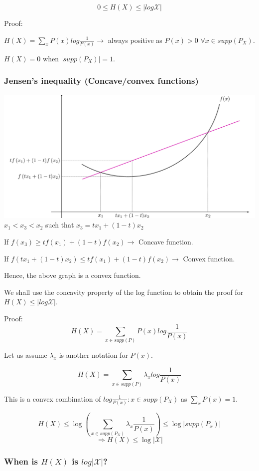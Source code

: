 \documentclass{article}
\begin{document}
$$ 0 \leq H(X) \leq |log \mathcal X|$$

Proof:

$ H(X)= \sum_x P(x)log \frac{1}{P(x)} \rightarrow $ always positive as $P(x)>0$ $\forall x \in supp(P_X)$.

$H(X)= 0$ when $|supp(P_X)|=1$.

\subsubsection{Jensen's inequality (Concave/convex functions)}

\includegraphics[width=\textwidth]{graph.png}
$x_1 < x_3 <x_2 $ such that $x_3= tx_1+(1-t)x_2$

If $f(x_3) \geq tf(x_1)+(1-t)f(x_2) \rightarrow $ Concave function.

If $f(tx_1+(1-t)x_2) \leq tf(x_1)+(1-t)f(x_2) \rightarrow $ Convex function.

Hence, the above graph is a convex function.

We shall use the concavity property of the log function to obtain the proof for $ H(X) \leq |log \mathcal X| $.

Proof:
$$ H(X)= \sum_{x \in supp(P)} P(x)log\frac{1}{P(x)}$$

Let us assume $\lambda_x$ is another notation for $P(x)$.

$$H(X)= \sum_{x \in supp(P)} \lambda_x log\frac{1}{P(x)}$$

This is a convex combination of $log\frac{1}{P(x)}:x \in supp(P_X)$ as $\sum_{x}P(x)=1$.

$$ H(X) \leq \log \left(\sum_{x \in supp(P_X)}\lambda_x \frac{1}{P(x)} \right) \leq \log |supp(P_x)|$$
$$ \Rightarrow H(X) \leq \log |\mathcal X |$$

\subsubsection{When is $H(X)$ is $ log|\mathcal X|$?}
\end{document}
